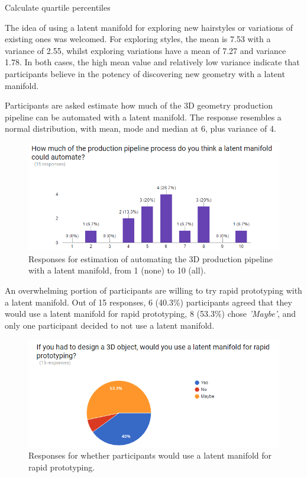 \documentclass[ %
author={Dillon Keith Diep},
supervisor={Dr. Carl Henrik Ek},
degree={MEng},
title={ART-CG:},
subtitle={Assisted Real-time Content Generation of 3D Hair by Learning Manifolds},
type={Research},
year={2017} ]{dissertation}
\begin{document}
{\color{red} Calculate quartile percentiles}

The idea of using a latent manifold for exploring new hairstyles or variations of existing ones was welcomed. For exploring styles, the mean is 7.53 with a variance of 2.55, whilst exploring variations have a mean of 7.27 and variance 1.78. In both cases, the high mean value and relatively low variance indicate that participants believe in the potency of discovering new geometry with a latent manifold.

Participants are asked estimate how much of the 3D geometry production pipeline can be automated with a latent manifold. The response resembles a normal distribution, with mean, mode and median at 6, plus variance of 4. 
\begin{figure}[!h]
	\centering
	\caption{Responses for estimation of automating the 3D production pipeline with a latent manifold, from 1 (none) to 10 (all).}
	\includegraphics[scale=0.7]{images/surveyAutomate}
\end{figure}

An overwhelming portion of participants are willing to try rapid prototyping with a latent manifold. Out of 15 responses, 6 (40.3\%) participants agreed that they would use a latent manifold for rapid prototyping, 8 (53.3\%) chose \textit{'Maybe'}, and only one participant decided to not use a latent manifold. 

\begin{figure}[!h]
	\centering
	\caption{Responses for whether participants would use a latent manifold for rapid prototyping.}
	\includegraphics[scale=0.7]{images/surveyPrototype}
\end{figure}
\end{document}
